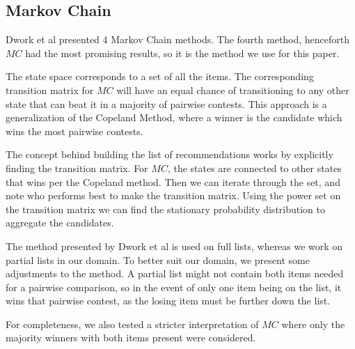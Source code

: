 \subsection{Markov Chain}\label{sec:markovchain}
Dwork et al presented 4 Markov Chain methods. The fourth method, henceforth $MC$ had the most promising results, so it is the method we use for this paper.

The state space corresponds to a set of all the items. The corresponding transition matrix for $MC$ will have an equal chance of transitioning to any other state that can beat it in a majority of pairwise contests. This approach is a generalization of the Copeland Method, where a winner is the candidate which wins the most pairwise contests.

The concept behind building the list of recommendations works by explicitly finding the transition matrix. For $MC$, the states are connected to other states that wins per the Copeland method. Then we can iterate through the set, and note who performs best to make the transition matrix. Using the power set on the transition matrix we can find the stationary probability distribution to aggregate the candidates.

The method presented by Dwork et al is used on full lists, whereas we work on partial lists in our domain. To better suit our domain, we present some adjustments to the method. A partial list might not contain both items needed for a pairwise comparison, so in the event of only one item being on the list, it wins that pairwise contest, as the losing item must be further down the list.

For completeness, we also tested a stricter interpretation of $MC$ where only the majority winners with both items present were considered.
\cite{rank:aggregation}
\cite{dwork2001rank}